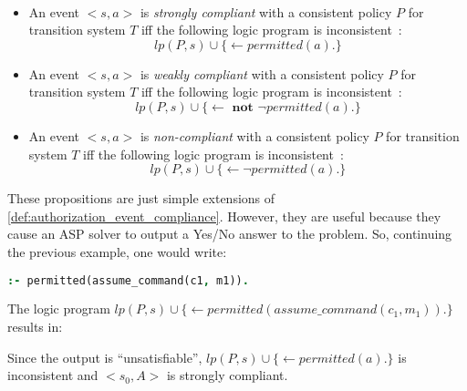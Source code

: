 \begin{definition}
    \label{def:authorization_event_compliance_full_knowledge}
    ~

    \begin{itemize}
        \item An event $<s, a>$ is \textit{strongly compliant} with a consistent policy $P$ for transition system $T$ iff the following logic program is inconsistent~\citep{gelfond_authorization_2008}:
            \begin{equation}
                lp(P, s) \cup \{ \leftarrow permitted(a). \}
            \end{equation}
        \item An event $<s, a>$ is \textit{weakly compliant} with a consistent policy $P$ for transition system $T$ iff the following logic program is inconsistent\footnotemark~\citep{gelfond_authorization_2008}:
            \begin{equation}
                lp(P, s) \cup \{ \leftarrow \textbf{ not } \neg permitted(a). \}
            \end{equation}
        \item An event $<s, a>$ is \textit{non-compliant} with a consistent policy $P$ for transition system $T$ iff the following logic program is inconsistent~\citep{gelfond_authorization_2008}:
            \begin{equation}
                lp(P, s) \cup \{ \leftarrow \neg permitted(a). \}
            \end{equation}
    \end{itemize}
\end{definition}


These propositions are just simple extensions of \cref{def:authorization_event_compliance}.
However, they are useful because they cause an ASP solver to output a Yes/No answer to the problem.
So, continuing the previous example, one would write:
\begin{lstlisting}[language=Prolog]
:- permitted(assume_command(c1, m1)).
\end{lstlisting}
The logic program $lp(P, s) \cup \{ \leftarrow permitted(assume\_command(c_1, m_1)). \}$ results in:

Since the output is ``unsatisfiable'', $lp(P, s) \cup \{ \leftarrow permitted(a). \}$ is inconsistent and $<s_0, A>$ is strongly compliant.


